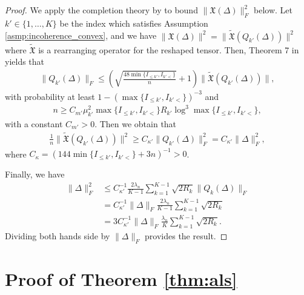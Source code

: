\begin{proof}
We apply the completion theory by \cite{candes2010matrix, candes2012exact} to bound $\|\mathfrak{X}(\Delta)\|_F^2$ below.
Let $k' \in \{1,\ldots,K\}$ be the index which satisfies Assumption \ref{asmp:incoherence_convex}, and we have $\|\mathfrak{X}(\Delta)\|^2 = \|\tilde{\mathfrak{X}}(Q_{k'}(\Delta))\|^2$ where $\tilde{\mathfrak{X}}$ is a rearranging operator for the reshaped tensor.
Then, Theorem 7 in \cite{candes2010matrix} yields that 
\begin{align*}
	\|Q_{k'}(\Delta)\|_F \leq \left(  \sqrt{\frac{48  \min\{I_{\leq k'}, I_{k'<}\}}{n}}+ 1 \right) \|\tilde{\mathfrak{X}}(Q_{k'}(\Delta))\|,
\end{align*}
with probability at least $1-( \max\{I_{\leq k'}, I_{k'<}\})^{-3}$ and
\begin{align*}
	n \geq C_{m'} \mu_{k'}^2  \max\{I_{\leq k'}, I_{k'<}\} R_{k'} \log^3  \max\{I_{\leq k'}, I_{k'<}\},
\end{align*}
with a constant $C_{m'} > 0$.
Then we obtain that 
\begin{align*}
	\frac{1}{n}\|\tilde{\mathfrak{X}}(Q_{k'}({\Delta}))\|^2 \geq   C_{\kappa'} \|Q_{k'}(\Delta)\|_F^2 = C_{\kappa'} \|\Delta\|_F^2,
\end{align*}
where $C_{\kappa} = (144  \min\{I_{\leq k'}, I_{k'<}\} + 3n)^{-1} > 0$.

Finally, we have
\begin{align*}
	\|\Delta\|_F^2 &\leq  C_{\kappa '}^{-1 } \frac{2 \lambda_n}{K-1}\sum_{k=1}^{K-1} \sqrt{2R_k }\|Q_k(\Delta)\|_F \\
	&= C_{\kappa '}^{-1 }\|\Delta\|_F \frac{2 \lambda_n}{K-1}\sum_{k=1}^{K-1} \sqrt{2R_k }\\
	&= 3C_{\kappa '}^{-1 }\|\Delta\|_F \frac{\lambda_n}{K}\sum_{k=1}^{K-1} \sqrt{2R_k }.
\end{align*}
Dividing both hands side by $\|\Delta\|_F$ provides the result.

\end{proof}


\section{Proof of Theorem \ref{thm:als}}

